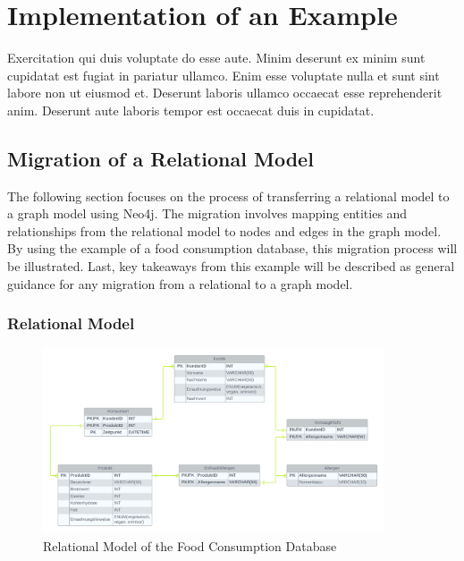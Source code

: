 \section{Implementation of an Example}\label{sec:implementationExampleNeo4j}

Exercitation qui duis voluptate do esse aute. Minim deserunt ex minim sunt cupidatat est fugiat in pariatur ullamco. Enim esse voluptate nulla et sunt sint labore non ut eiusmod et. Deserunt laboris ullamco occaecat esse reprehenderit anim. Deserunt aute laboris tempor est occaecat duis in cupidatat.

\subsection{Migration of a Relational Model}\label{subsec:migrationRelationModelNeo4j}

The following section focuses on the process of transferring a relational model to a graph model using Neo4j. The migration involves mapping entities and relationships from the relational model to nodes and edges in the graph model. By using the example of a food consumption database, this migration process will be illustrated. Last, key takeaways from this example will be described as general guidance for any migration from a relational to a graph model.

\subsubsection*{Relational Model}

\begin{figure}[H]
    \centering
    \caption{Relational Model of the Food Consumption Database}\label{fig:relationalModelNeo4j}
    \includegraphics[width=0.9\textwidth]{images/neo4j_example_relational_model.png}
\end{figure}

